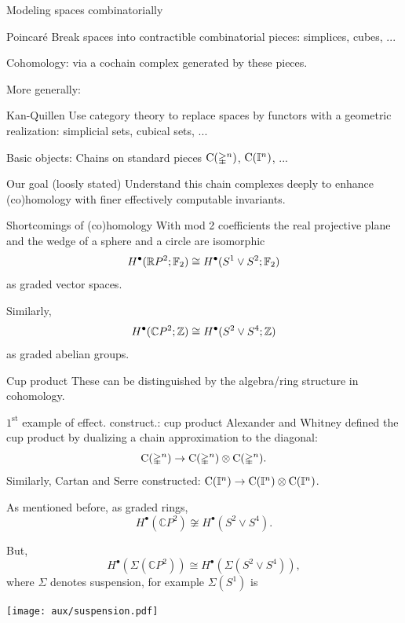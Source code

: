 \documentclass[10pt,t]{beamer} %
\begin{document}
\begin{frame}{Modeling spaces combinatorially}
	\pause
	\begin{block}{Poincar\'{e}}
		Break spaces into contractible combinatorial pieces: simplices, cubes, ...
	\end{block}

	\pause \textcolor{pblue}{Cohomology:}
	via a cochain complex generated by these pieces.

	\medskip \pause	More generally:
	\begin{block}{Kan-Quillen}
		Use category theory to replace spaces by functors with a geometric realization: simplicial sets, cubical sets, ...
	\end{block}

	\pause \textcolor{pblue}{Basic objects:}
	Chains on standard pieces $\operatorname{C}(\mathbb{\Delta}^n)$, $\operatorname{C}(\mathbb{I}^n)$, ...

	\smallskip \pause
	\begin{block}{Our goal (loosly stated)}
		Understand this chain complexes deeply to enhance (co)homology with finer effectively computable invariants.
	\end{block}
\end{frame}

\begin{frame}{Shortcomings of (co)homology}
	\pause With mod 2 coefficients the real projective plane and the wedge of a sphere and a circle are isomorphic
	\[
	H^\bullet(\mathbb{R} P^2; {\mathbb{F}_2}) \cong H^\bullet(S^1 \vee S^2; {\mathbb{F}_2})
	\]
	as graded vector spaces.

	\bigskip \pause
	Similarly,
	\[
	H^\bullet(\mathbb{C} P^2; \mathbb{Z}) \cong H^\bullet(S^2 \vee S^4; \mathbb{Z})
	\]
	as graded abelian groups.

	\bigskip \pause
	\begin{block}{Cup product}
		These can be distinguished by the algebra/ring structure in cohomology.
	\end{block}
\end{frame}

\begin{frame}[fragile]{$1^{\mathrm{st}}$ example of effect. construct.: cup product}
	\pause Alexander and Whitney defined the cup product by dualizing a chain approximation to the diagonal:
	\[
	\operatorname{C}(\mathbb{\Delta}^n) \to \operatorname{C}(\mathbb{\Delta}^n) \otimes \operatorname{C}(\mathbb{\Delta}^n).
	\]
	\pause Similarly, Cartan and Serre constructed: $\operatorname{C}(\mathbb{I}^n) \to \operatorname{C}(\mathbb{I}^n) \otimes \operatorname{C}(\mathbb{I}^n)$.

	\bigskip \pause
	As mentioned before, as graded rings,
	\[
	H^\bullet(\mathbb{C} P^2) \not\cong H^\bullet(S^2 \vee S^4).
	\]

	\vskip -8pt \pause But,
	\[
	H^\bullet(\Sigma(\mathbb{C} P^2)) \cong H^\bullet(\Sigma(S^2 \vee S^4)),
	\]
	where $\Sigma$ denotes suspension, for example $\Sigma(S^1)$ is
	\begin{center}
		\texttt{[image: aux/suspension.pdf]}
	\end{center}
\end{frame}
\end{document}
